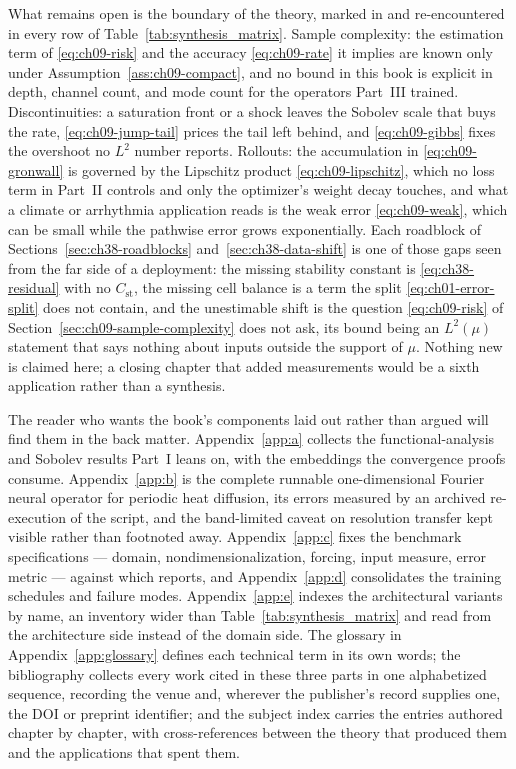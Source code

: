 What remains open is the boundary of the theory, marked in
 and re-encountered in every row
of Table~\ref{tab:synthesis_matrix}. Sample complexity: the estimation term of
\eqref{eq:ch09-risk} and the accuracy \eqref{eq:ch09-rate} it implies are known only under
Assumption~\ref{ass:ch09-compact}, and no bound in this book is explicit in depth, channel
count, and mode count for the operators Part~III trained. Discontinuities: a saturation front
or a shock leaves the Sobolev scale that buys the rate, \eqref{eq:ch09-jump-tail} prices the
tail left behind, and \eqref{eq:ch09-gibbs} fixes the overshoot no $L^2$ number reports.
Rollouts: the accumulation in \eqref{eq:ch09-gronwall} is governed by the Lipschitz product
\eqref{eq:ch09-lipschitz}, which no loss term in Part~II controls and only the optimizer's
weight decay touches, and what a climate or
arrhythmia application reads is the weak error \eqref{eq:ch09-weak}, which can be small while
the pathwise error grows exponentially. Each roadblock of
Sections~\ref{sec:ch38-roadblocks} and~\ref{sec:ch38-data-shift} is
one of those gaps seen from the far side of a deployment: the missing stability constant is
\eqref{eq:ch38-residual} with no $C_{\mathrm{st}}$, the missing cell balance is a term the
split \eqref{eq:ch01-error-split} does not contain, and the unestimable shift is the question
\eqref{eq:ch09-risk} of Section~\ref{sec:ch09-sample-complexity} does not ask, its bound being
an $L^{2}(\mu)$ statement that says nothing about inputs outside the support of $\mu$. Nothing new is claimed here; a closing chapter that added measurements would be a sixth
application rather than a synthesis.

The reader who wants the book's components laid out rather than argued will find them in the
back matter. Appendix~\ref{app:a} collects the functional-analysis and Sobolev results Part~I
leans on, with the embeddings the convergence proofs consume. Appendix~\ref{app:b} is the
complete runnable one-dimensional Fourier neural operator for periodic heat diffusion, its
errors measured by an archived re-execution of the script, and the band-limited caveat on
resolution transfer kept visible
rather than footnoted away. Appendix~\ref{app:c} fixes the benchmark
specifications --- domain, nondimensionalization, forcing, input measure, error
metric --- against which  reports,
and Appendix~\ref{app:d} consolidates the training schedules and failure modes.
Appendix~\ref{app:e} indexes the architectural variants by name, an inventory wider than
Table~\ref{tab:synthesis_matrix} and read from the architecture side instead of the domain
side. The glossary in Appendix~\ref{app:glossary} defines each technical term in its own words;
the bibliography collects every work cited in these three parts in one alphabetized sequence,
recording the venue and, wherever the publisher's record supplies one, the DOI or preprint
identifier; and the subject index carries the entries authored chapter by chapter, with
cross-references
between the theory that produced them and the applications that spent
them.

\vspace{1.5em}

